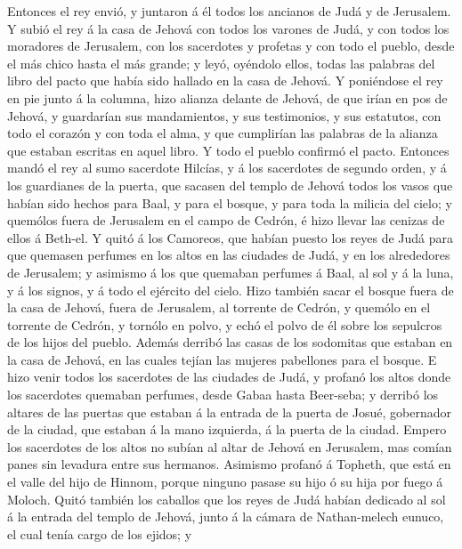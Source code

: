  Entonces el rey envió, y juntaron á él todos los ancianos
de Judá y de Jerusalem.  Y subió el rey á la casa de
Jehová con todos los varones de Judá, y con todos los moradores de
Jerusalem, con los sacerdotes y profetas y con todo el pueblo, desde el
más chico hasta el más grande; y leyó, oyéndolo ellos, todas las
palabras del libro del pacto que había sido hallado en la casa de
Jehová.  Y poniéndose el rey en pie junto á la columna,
hizo alianza delante de Jehová, de que irían en pos de Jehová, y
guardarían sus mandamientos, y sus testimonios, y sus estatutos, con
todo el corazón y con toda el alma, y que cumplirían las palabras de la
alianza que estaban escritas en aquel libro. Y todo el pueblo confirmó
el pacto.  Entonces mandó el rey al sumo sacerdote
Hilcías, y á los sacerdotes de segundo orden, y á los guardianes de la
puerta, que sacasen del templo de Jehová todos los vasos que habían sido
hechos para Baal, y para el bosque, y para toda la milicia del cielo; y
quemólos fuera de Jerusalem en el campo de Cedrón, é hizo llevar las
cenizas de ellos á Beth-el.  Y quitó á los Camoreos, que
habían puesto los reyes de Judá para que quemasen perfumes en los altos
en las ciudades de Judá, y en los alrededores de Jerusalem; y asimismo á
los que quemaban perfumes á Baal, al sol y á la luna, y á los signos, y
á todo el ejército del cielo.  Hizo también sacar el
bosque fuera de la casa de Jehová, fuera de Jerusalem, al torrente de
Cedrón, y quemólo en el torrente de Cedrón, y tornólo en polvo, y echó
el polvo de él sobre los sepulcros de los hijos del pueblo.
 Además derribó las casas de los sodomitas que estaban en
la casa de Jehová, en las cuales tejían las mujeres pabellones para el
bosque.  E hizo venir todos los sacerdotes de las ciudades
de Judá, y profanó los altos donde los sacerdotes quemaban perfumes,
desde Gabaa hasta Beer-seba; y derribó los altares de las puertas que
estaban á la entrada de la puerta de Josué, gobernador de la ciudad, que
estaban á la mano izquierda, á la puerta de la ciudad. 
Empero los sacerdotes de los altos no subían al altar de Jehová en
Jerusalem, mas comían panes sin levadura entre sus hermanos.
 Asimismo profanó á Topheth, que está en el valle del
hijo de Hinnom, porque ninguno pasase su hijo ó su hija por fuego á
Moloch.  Quitó también los caballos que los reyes de Judá
habían dedicado al sol á la entrada del templo de Jehová, junto á la
cámara de Nathan-melech eunuco, el cual tenía cargo de los ejidos; y
